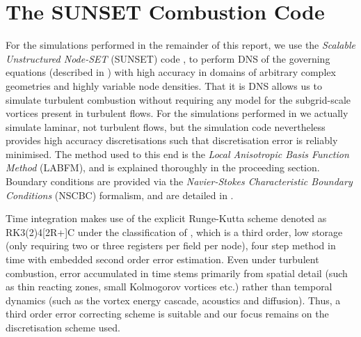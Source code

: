 \section{The SUNSET Combustion Code}

For the simulations performed in the remainder of this report, we use the \emph{Scalable Unstructured Node-SET} (SUNSET) code \cite{kingSunsetFlames,king2024MeshFreeFrameworkHighOrdera}, to perform DNS of the governing equations (described in ) with high accuracy in domains of arbitrary complex geometries and highly variable node densities. That it is DNS allows us to simulate turbulent combustion without requiring any model for the subgrid-scale vortices present in turbulent flows. For the simulations performed in  we actually simulate laminar, not turbulent flows, but the simulation code nevertheless provides high accuracy discretisations such that discretisation error is reliably minimised. The method used to this end is the \emph{Local Anisotropic Basis Function Method} (LABFM), and is explained thoroughly in the proceeding section. Boundary conditions are provided via the \emph{Navier-Stokes Characteristic Boundary Conditions} (NSCBC) formalism, and are detailed in .

Time integration makes use of the explicit Runge-Kutta scheme denoted as RK3(2)4[2R+]C under the classification of \cite{kennedy2000LowStorageExplicitRunge}, which is a third order, low storage (only requiring two or three registers per field per node), four step method in time with embedded second order error estimation. Even under turbulent combustion, error accumulated in time stems primarily from spatial detail (such as thin reacting zones, small Kolmogorov vortices etc.) rather than temporal dynamics (such as the vortex energy cascade, acoustics and diffusion). Thus, a third order error correcting scheme is suitable and our focus remains on the discretisation scheme used.

